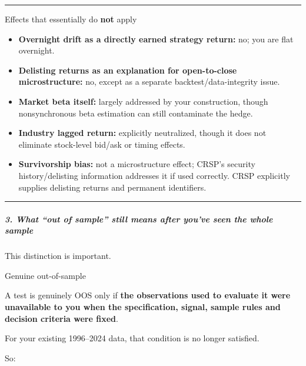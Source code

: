 \begin{center}\rule{0.5\linewidth}{0.5pt}\end{center}

Effects that essentially do \textbf{not} apply

\begin{itemize}
\tightlist
\item
  \textbf{Overnight drift as a directly earned strategy return:} no; you are flat overnight.
\item
  \textbf{Delisting returns as an explanation for open-to-close microstructure:} no, except as a separate backtest/data-integrity issue.
\item
  \textbf{Market beta itself:} largely addressed by your construction, though nonsynchronous beta estimation can still contaminate the hedge.
\item
  \textbf{Industry lagged return:} explicitly neutralized, though it does not eliminate stock-level bid/ask or timing effects.
\item
  \textbf{Survivorship bias:} not a microstructure effect; CRSP's security history/delisting information addresses it if used correctly. CRSP explicitly supplies delisting returns and permanent identifiers.
\end{itemize}

\begin{center}\rule{0.5\linewidth}{0.5pt}\end{center}

\hypertarget{what-out-of-sample-still-means-after-youve-seen-the-whole-sample}{%
\subparagraph{3. What ``out of sample'' still means after you've seen the whole sample}\label{what-out-of-sample-still-means-after-youve-seen-the-whole-sample}}

This distinction is important.

Genuine out-of-sample

A test is genuinely OOS only if \textbf{the observations used to evaluate it were unavailable to you when the specification, signal, sample rules and decision criteria were fixed}.

For your existing 1996--2024 data, that condition is no longer satisfied.

So:

